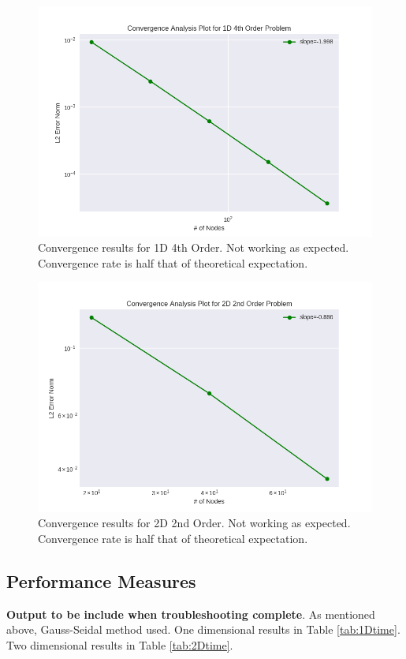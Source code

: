 \documentclass[letterpaper,12pt]{article}
\begin{document}
\begin{figure}[h]
\centering
\label{fig:1d4th}
\includegraphics[width=1 \textwidth]{1d4th.PNG}
\caption{Convergence results for 1D 4th Order. Not working as expected. Convergence rate is half that of theoretical expectation.}
\end{figure}

\begin{figure}[h]
\centering
\label{fig:2d2nd}
\includegraphics[width=1 \textwidth]{2d2nd.PNG}
\caption{Convergence results for 2D 2nd Order. Not working as expected. Convergence rate is half that of theoretical expectation.}
\end{figure}

\subsection{Performance Measures}
\textbf{Output to be include when troubleshooting complete}. As mentioned above, Gauss-Seidal method used. One dimensional results in Table \ref{tab:1Dtime}. Two dimensional results in Table \ref{tab:2Dtime}.
\end{document}
